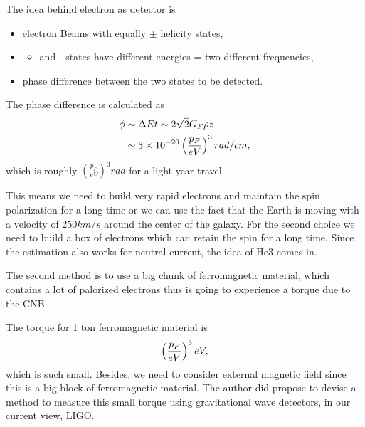 \documentclass[letterpaper,12pt,english]{sphinxmanual}
\begin{document}
The idea behind electron as detector is
\begin{itemize}
\item {} 
electron Beams with equally \(\pm\) helicity states,

\item {} \begin{itemize}
\item {} 
and - states have different energies = two different frequencies,

\end{itemize}

\item {} 
phase difference between the two states to be detected.

\end{itemize}

The phase difference is calculated as
\begin{gather}
\begin{split}\phi &\sim \Delta E t  \sim 2\sqrt{2}G_F \rho z \\
& \sim 3\times 10^{-20} \left( \frac{p_F}{eV} \right)^3 rad/cm,\end{split}\notag
\end{gather}
which is roughly \(\left( \frac{p_F}{eV} \right)^3 rad\) for a light year travel.

This means we need to build very rapid electrons and maintain the spin polarization for a long time or we can use the fact that the Earth is moving with a velocity of \(250 km/s\) around the center of the galaxy. For the second choice we need to build a box of electrons which can retain the spin for a long time. Since the estimation also works for neutral current, the idea of He3 comes in.

The second method is to use a big chunk of ferromagnetic material, which contains a lot of palorized electrons thus is going to experience a torque due to the CNB.

The torque for 1 ton ferromagnetic material is
\begin{gather}
\begin{split}\left( \frac{p_F}{eV}\right)^3 eV,\end{split}\notag
\end{gather}
which is such small. Besides, we need to consider external magnetic field since this is a big block of ferromagnetic material. The author did propose to devise a method to measure this small torque using gravitational wave detectors, in our current view, LIGO.
\end{document}
